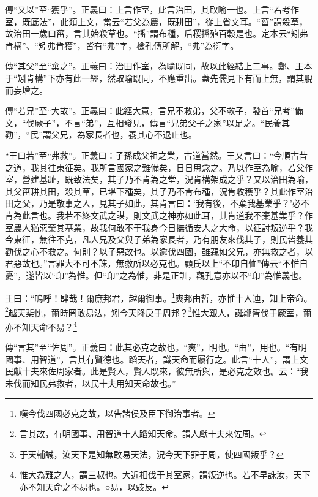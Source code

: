 {\noindent\zhuan{}\fzbyks 傳“又以”至“獲乎”。正義曰：上言作室，此言治田，其取喻一也。上言“若考作室，既厎法”，此類上文，當云“若父為農，既耕田”，從上省文耳。“菑”謂殺草，故治田一歲曰菑，言其始殺草也。“播”謂布種，后稷播殖百穀是也。定本云“矧弗肯構”、“矧弗肯獲”，皆有“弗”字，檢孔傳所解，“弗”為衍字。 \par}

{\noindent\zhuan{}\fzbyks 傳“其父”至“棄之”。正義曰：治田作室，為喻既同，故以此經結上二事。鄭、王本于“矧肯構”下亦有此一經，然取喻既同，不應重出。蓋先儒見下有而上無，謂其脫而妄增之。 \par}

{\noindent\zhuan{}\fzbyks 傳“若兄”至“大故”。正義曰：此經大意，言兄不救弟，父不救子，發首“兄考”備文，“伐厥子”，不言“弟”，互相發見，傳言“兄弟父子之家”以足之。“民養其勸”，“民”謂父兄，為家長者也，養其心不退止也。 \par}

{\noindent\shu{}\fzkt “王曰若”至“弗救”。正義曰：子孫成父祖之業，古道當然。王又言曰：“今順古昔之道，我其往東征矣。我所言國家之難備矣，日日思念之。乃以作室為喻，若父作室，營建基趾，既致法矣，其子乃不肯為之堂，況肯構架成之乎？又以治田為喻，其父菑耕其田，殺其草，已堪下種矣，其子乃不肯布種，況肯收穫乎？其此作室治田之父，乃是敬事之人，見其子如此，其肯言曰：‘我有後，不棄我基業乎？’必不肯為此言也。我若不終文武之謀，則文武之神亦如此耳，其肯道我不棄基業乎？作室農人猶惡棄其基業，故我何敢不于我身今日撫循安人之大命，以征討叛逆乎？我今東征，無往不克，凡人兄及父與子弟為家長者，乃有朋友來伐其子，則民皆養其勸伐之心不救之。何則？以子惡故也。以逾伐四國，雖親如父兄，亦無救之者，以君惡故也。”言罪大不可不誅，無救所以必克也。顧氏以上“不卬自恤”傳云“不惟自憂”，遂皆以“卬”為惟。但“卬”之為惟，非是正訓，觀孔意亦以不“卬”為惟義也。 \par}

王曰：“嗚呼！肆哉！爾庶邦君，越爾御事。\footnote{嘆今伐四國必克之故，以告諸侯及臣下御治事者。}爽邦由哲，亦惟十人迪，知上帝命。\footnote{言其故，有明國事、用智道十人蹈知天命。謂人獻十夫來佐周。}越天棐忱，爾時罔敢易法，矧今天降戾于周邦？\footnote{于天輔誠，汝天下是知無敢易天法，況今天下罪于周，使四國叛乎？}惟大艱人，誕鄰胥伐于厥室，爾亦不知天命不易？\footnote{惟大為難之人，謂三叔也。大近相伐于其室家，謂叛逆也。若不早誅汝，天下亦不知天命之不易也。○易，以豉反。}


{\noindent\zhuan{}\fzbyks 傳“言其”至“佐周”。正義曰：此其必克之故也。“爽”，明也。“由”，用也。“有明國事、用智道”，言其有賢德也。蹈天者，識天命而履行之。此言“十人”，謂上文民獻十夫來佐周家者。此是賢人，賢人既來，彼無所與，是必克之效也。云：“我未伐而知民弗救者，以民十夫用知天命故也。” \par}

